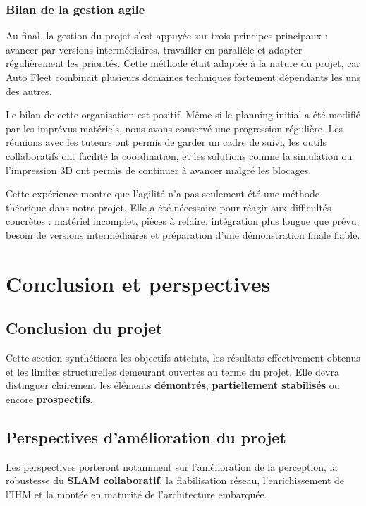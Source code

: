 \documentclass[11pt,a4paper]{report}
\newcommand{\kw}[1]{\textbf{#1}}
\begin{document}
\subsection{Bilan de la gestion agile}

Au final, la gestion du projet s'est appuyée sur trois principes principaux : avancer par versions intermédiaires, travailler en parallèle et adapter régulièrement les priorités. Cette méthode était adaptée à la nature du projet, car Auto Fleet combinait plusieurs domaines techniques fortement dépendants les uns des autres.

Le bilan de cette organisation est positif. Même si le planning initial a été modifié par les imprévus matériels, nous avons conservé une progression régulière. Les réunions avec les tuteurs ont permis de garder un cadre de suivi, les outils collaboratifs ont facilité la coordination, et les solutions comme la simulation ou l'impression 3D ont permis de continuer à avancer malgré les blocages.

Cette expérience montre que l'agilité n'a pas seulement été une méthode théorique dans notre projet. Elle a été nécessaire pour réagir aux difficultés concrètes : matériel incomplet, pièces à refaire, intégration plus longue que prévu, besoin de versions intermédiaires et préparation d'une démonstration finale fiable.



\chapter{Conclusion et perspectives}

\section{Conclusion du projet}

Cette section synthétisera les objectifs atteints, les résultats effectivement obtenus et les limites structurelles demeurant ouvertes au terme du projet. Elle devra distinguer clairement les éléments \kw{démontrés}, \kw{partiellement stabilisés} ou encore \kw{prospectifs}.

\section{Perspectives d'amélioration du projet}

Les perspectives porteront notamment sur l’amélioration de la perception, la robustesse du \kw{SLAM collaboratif}, la fiabilisation réseau, l’enrichissement de l’IHM et la montée en maturité de l’architecture embarquée.
\end{document}
